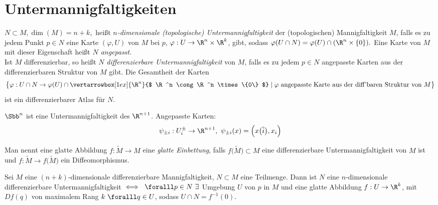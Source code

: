 \section{Untermannigfaltigkeiten}

\begin{defn}
	$ N \subset M, \dim(M) = n+k, $ heißt \emph{$n$-dimensionale (topologische) Untermannigfaltigkeit} der (topologischen) Mannigfaltigkeit $M$, falls es zu jedem Punkt $p \in N$ eine Karte $ (\varphi,U)$ von $M$ bei $p$, $ \varphi: U \to \R^n \times \R^k $, gibt, sodass $ \varphi(U \cap N) = \varphi(U) \cap (\R^n \times \{0\}). $ Eine Karte von $M$ mit dieser Eigenschaft heißt \emph{$N$ angepasst}.\\
	Ist $M$ differenzierbar, so heißt $N$ \emph{differenzierbare Untermannigfaltigkeit} von $M$, falls es zu jedem $p \in N$ angepasste Karten aus der differenzierbaren Struktur von $M$ gibt. Die Gesamtheit der Karten 
	$$ \big\{ \varphi: U \cap N \to \varphi(U) \cap \vertarrowbox[1ex]{\R^n}{$ \R^n \cong \R^n \times \{0\} $} \mid \varphi\ \text{angepasste Karte aus der diff'baren Struktur von } M \big\} $$
	ist ein differenzierbarer Atlas für $N$.
	\begin{exmp*}
		$ \Sbb^n $ ist eine Untermannigfaltigkeit des $\R^{n+1}$. Angepasste Karten:
		\[ \psi_{\pm i}: U_i^\pm \to \R^{n+1},\ \psi_{\pm i}(x) = \Big( x \big( \hat{i} \big),x_i \Big) \]
	\end{exmp*}
	Man nennt eine glatte Abbildung $ f: \tilde{M} \to M $ eine \emph{glatte Einbettung}, falls $ f\big( \tilde{M} \big) \subset M $ eine differenzierbare Untermannigfaltigkeit von $M$ ist und $ f: \tilde{M} \to f\big( \tilde{M} \big) $ ein Diffeomorphismus.
\end{defn}

\begin{thm}
	Sei $M$ eine $(n+k)$-dimensionale differenzierbare Mannigfaltigkeit, $ N \subset M$ eine Teilmenge. Dann ist $N$ eine $n$-dimensionale differenzierbare Untermannigfaltigkeit $ \iff \ \foralll p \in N \ \exists $ Umgebung $U$ von $p$ in $M$ und eine glatte Abbildung $ f: U \to \R^k$, mit $ Df(q) $ von maximalem Rang $k\ \foralll q \in U$, sodass $ U \cap N = f^{-1}(0). $
\end{thm}

